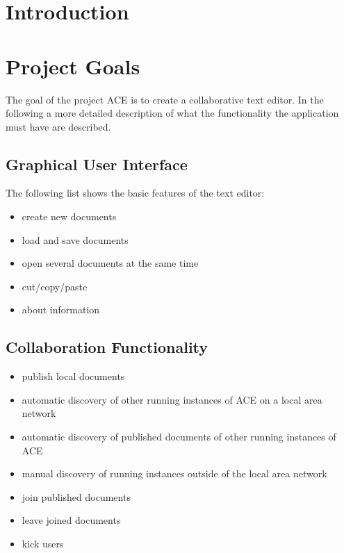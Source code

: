 \documentclass[11pt,a4paper]{article}
\begin{document}


\section{Introduction}

\section{Project Goals}

The goal of the project ACE is to create a collaborative text editor. In the following a more detailed
description of what the functionality the application must have are described.

\subsection{Graphical User Interface}

The following list shows the basic features of the text editor:

\begin{itemize}
 \item create new documents
 \item load and save documents
 \item open several documents at the same time
 \item cut/copy/paste
 \item about information
\end{itemize}

\subsection{Collaboration Functionality}

\begin{itemize}
 \item publish local documents
 \item automatic discovery of other running instances of ACE on a local area network
 \item automatic discovery of published documents of other running instances of ACE
 \item manual discovery of running instances outside of the local area network
 \item join published documents
 \item leave joined documents
 \item kick users
\end{itemize}
\end{document}
